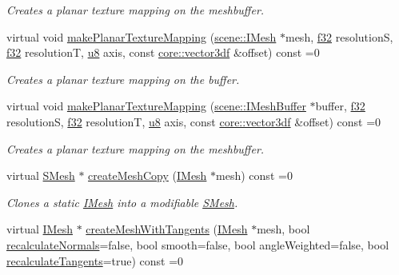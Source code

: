 \begin{DoxyCompactItemize}
\begin{DoxyCompactList}\small\item\em Creates a planar texture mapping on the meshbuffer. \end{DoxyCompactList}\item 
virtual void \hyperlink{classirr_1_1scene_1_1IMeshManipulator_abc1b4ae56f126e8466ba6f6634a0f723}{make\+Planar\+Texture\+Mapping} (\hyperlink{classirr_1_1scene_1_1IMesh}{scene\+::\+I\+Mesh} $\ast$mesh, \hyperlink{namespaceirr_a0277be98d67dc26ff93b1a6a1d086b07}{f32} resolutionS, \hyperlink{namespaceirr_a0277be98d67dc26ff93b1a6a1d086b07}{f32} resolutionT, \hyperlink{namespaceirr_a646874f69af8ff87fc10201b0254a761}{u8} axis, const \hyperlink{namespaceirr_1_1core_ae6e2b2a6c552833ebbd5b7463d03586b}{core\+::vector3df} \&offset) const =0
\begin{DoxyCompactList}\small\item\em Creates a planar texture mapping on the buffer. \end{DoxyCompactList}\item 
virtual void \hyperlink{classirr_1_1scene_1_1IMeshManipulator_a28c9aaddc04baa710138a065457f9df1}{make\+Planar\+Texture\+Mapping} (\hyperlink{classirr_1_1scene_1_1IMeshBuffer}{scene\+::\+I\+Mesh\+Buffer} $\ast$buffer, \hyperlink{namespaceirr_a0277be98d67dc26ff93b1a6a1d086b07}{f32} resolutionS, \hyperlink{namespaceirr_a0277be98d67dc26ff93b1a6a1d086b07}{f32} resolutionT, \hyperlink{namespaceirr_a646874f69af8ff87fc10201b0254a761}{u8} axis, const \hyperlink{namespaceirr_1_1core_ae6e2b2a6c552833ebbd5b7463d03586b}{core\+::vector3df} \&offset) const =0
\begin{DoxyCompactList}\small\item\em Creates a planar texture mapping on the meshbuffer. \end{DoxyCompactList}\item 
virtual \hyperlink{structirr_1_1scene_1_1SMesh}{S\+Mesh} $\ast$ \hyperlink{classirr_1_1scene_1_1IMeshManipulator_a3d2e7401f1d43919834a1bfe0b65e77f}{create\+Mesh\+Copy} (\hyperlink{classirr_1_1scene_1_1IMesh}{I\+Mesh} $\ast$mesh) const =0
\begin{DoxyCompactList}\small\item\em Clones a static \hyperlink{classirr_1_1scene_1_1IMesh}{I\+Mesh} into a modifiable \hyperlink{structirr_1_1scene_1_1SMesh}{S\+Mesh}. \end{DoxyCompactList}\item 
virtual \hyperlink{classirr_1_1scene_1_1IMesh}{I\+Mesh} $\ast$ \hyperlink{classirr_1_1scene_1_1IMeshManipulator_ab849bd2c83b206de1e5da19ce3481e35}{create\+Mesh\+With\+Tangents} (\hyperlink{classirr_1_1scene_1_1IMesh}{I\+Mesh} $\ast$mesh, bool \hyperlink{classirr_1_1scene_1_1IMeshManipulator_a8dba16b7eedeac07761c9c1247944429}{recalculate\+Normals}=false, bool smooth=false, bool angle\+Weighted=false, bool \hyperlink{classirr_1_1scene_1_1IMeshManipulator_a0ea43e8c4e8489551228b3005d325cd6}{recalculate\+Tangents}=true) const =0

\end{DoxyCompactItemize}
